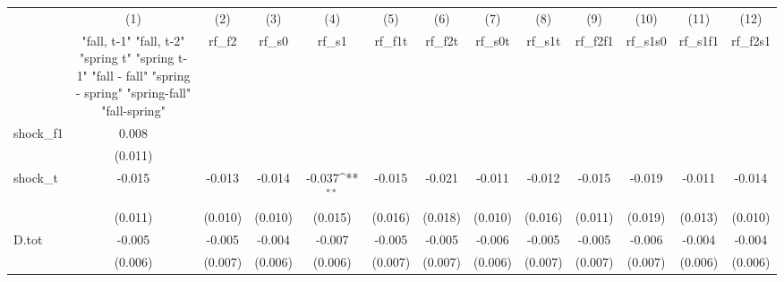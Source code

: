 {
\def\sym#1{\ifmmode^{#1}\else\(^{#1}\)\fi}
\begin{tabular}{l*{12}{c}}
\toprule
            &\multicolumn{1}{c}{(1)}&\multicolumn{1}{c}{(2)}&\multicolumn{1}{c}{(3)}&\multicolumn{1}{c}{(4)}&\multicolumn{1}{c}{(5)}&\multicolumn{1}{c}{(6)}&\multicolumn{1}{c}{(7)}&\multicolumn{1}{c}{(8)}&\multicolumn{1}{c}{(9)}&\multicolumn{1}{c}{(10)}&\multicolumn{1}{c}{(11)}&\multicolumn{1}{c}{(12)}\\
            &\multicolumn{1}{c}{  "fall, t-1" "fall, t-2" "spring t" "spring t-1"  "fall - fall" "spring - spring" "spring-fall" "fall-spring" }&\multicolumn{1}{c}{rf\_f2}&\multicolumn{1}{c}{rf\_s0}&\multicolumn{1}{c}{rf\_s1}&\multicolumn{1}{c}{rf\_f1t}&\multicolumn{1}{c}{rf\_f2t}&\multicolumn{1}{c}{rf\_s0t}&\multicolumn{1}{c}{rf\_s1t}&\multicolumn{1}{c}{rf\_f2f1}&\multicolumn{1}{c}{rf\_s1s0}&\multicolumn{1}{c}{rf\_s1f1}&\multicolumn{1}{c}{rf\_f2s1}\\
\midrule
shock\_f1    &       0.008         &                     &                     &                     &                     &                     &                     &                     &                     &                     &                     &                     \\
            &     (0.011)         &                     &                     &                     &                     &                     &                     &                     &                     &                     &                     &                     \\
\addlinespace
shock\_t     &      -0.015         &      -0.013         &      -0.014         &      -0.037\sym{**} &      -0.015         &      -0.021         &      -0.011         &      -0.012         &      -0.015         &      -0.019         &      -0.011         &      -0.014         \\
            &     (0.011)         &     (0.010)         &     (0.010)         &     (0.015)         &     (0.016)         &     (0.018)         &     (0.010)         &     (0.016)         &     (0.011)         &     (0.019)         &     (0.013)         &     (0.010)         \\
\addlinespace
D.tot       &      -0.005         &      -0.005         &      -0.004         &      -0.007         &      -0.005         &      -0.005         &      -0.006         &      -0.005         &      -0.005         &      -0.006         &      -0.004         &      -0.004         \\
            &     (0.006)         &     (0.007)         &     (0.006)         &     (0.006)         &     (0.007)         &     (0.007)         &     (0.006)         &     (0.007)         &     (0.007)         &     (0.007)         &     (0.006)         &     (0.006)         \\

\end{tabular}}
